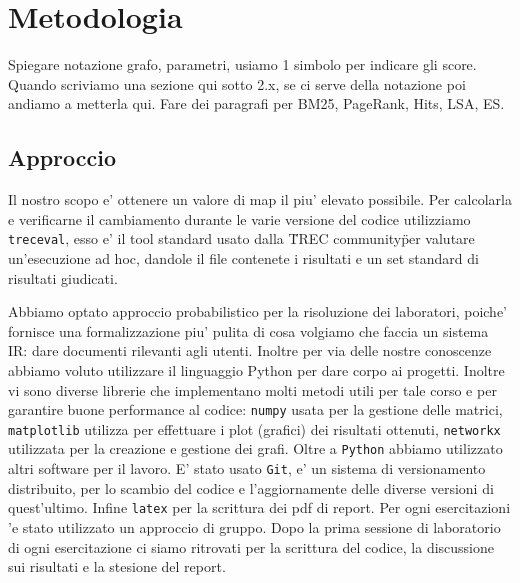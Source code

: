 \section{Metodologia}
\label{sec:metodologia}

Spiegare notazione grafo, parametri, usiamo 1 simbolo per indicare gli score. Quando scriviamo una sezione qui sotto 2.x, se ci serve della notazione poi andiamo a metterla qui. 
Fare dei paragrafi per BM25, PageRank, Hits, LSA, ES.


\subsection{Approccio}
\label{sec:approccio}

Il nostro scopo e' ottenere un valore di map il piu' elevato possibile. Per calcolarla e verificarne il cambiamento durante le varie versione del codice utilizziamo \texttt{treceval}, esso e' il tool standard usato dalla \"TREC community\" per valutare un'esecuzione ad hoc, dandole il file contenete i risultati e un set standard di risultati giudicati.  

Abbiamo optato approccio probabilistico per la risoluzione dei laboratori, poiche' fornisce una formalizzazione piu' pulita di cosa volgiamo che faccia un sistema IR: dare documenti rilevanti agli utenti. 
Inoltre per via delle nostre conoscenze abbiamo voluto utilizzare il linguaggio Python per dare corpo ai progetti. Inoltre vi sono diverse librerie che implementano molti metodi utili per tale corso e per garantire buone performance al codice: \texttt{numpy} usata per la gestione delle matrici, \texttt{matplotlib} utilizza per effettuare i plot (grafici) dei risultati ottenuti, \texttt{networkx} utilizzata per la creazione e gestione dei grafi.
Oltre a \texttt{Python} abbiamo utilizzato altri software per il lavoro. E' stato usato \texttt{Git}, e' un sistema di versionamento distribuito, per lo scambio del codice e l'aggiornamente delle diverse versioni di quest'ultimo. Infine \texttt{latex} per la scrittura dei pdf di report.
Per ogni esercitazioni 'e stato utilizzato un approccio di gruppo. Dopo la prima sessione di laboratorio di ogni esercitazione ci siamo ritrovati per la scrittura del codice, la discussione sui risultati e la stesione del report.

